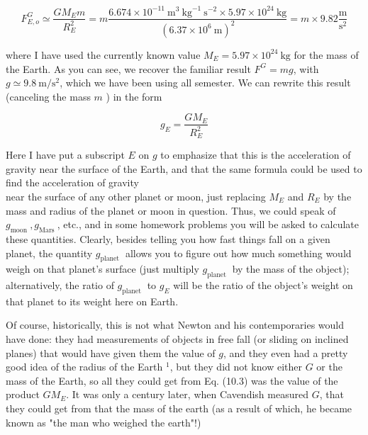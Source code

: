 \documentclass[10pt]{article}
\begin{document}
\begin{equation*}
F_{E, o}^{G} \simeq \frac{G M_{E} m}{R_{E}^{2}}=m \frac{6.674 \times 10^{-11} \mathrm{~m}^{3} \mathrm{~kg}^{-1} \mathrm{~s}^{-2} \times 5.97 \times 10^{24} \mathrm{~kg}}{\left(6.37 \times 10^{6} \mathrm{~m}\right)^{2}}=m \times 9.82 \frac{\mathrm{m}}{\mathrm{s}^{2}} \tag{10.2}
\end{equation*}


where I have used the currently known value $M_{E}=5.97 \times 10^{24} \mathrm{~kg}$ for the mass of the Earth. As you can see, we recover the familiar result $F^{G}=m g$, with $g \simeq 9.8 \mathrm{~m} / \mathrm{s}^{2}$, which we have been using all semester. We can rewrite this result (canceling the mass $m$ ) in the form


\begin{equation*}
g_{E}=\frac{G M_{E}}{R_{E}^{2}} \tag{10.3}
\end{equation*}


Here I have put a subscript $E$ on $g$ to emphasize that this is the acceleration of gravity near the surface of the Earth, and that the same formula could be used to find the acceleration of gravity\\
near the surface of any other planet or moon, just replacing $M_{E}$ and $R_{E}$ by the mass and radius of the planet or moon in question. Thus, we could speak of $g_{\text {moon }}, g_{\text {Mars }}$, etc., and in some homework problems you will be asked to calculate these quantities. Clearly, besides telling you how fast things fall on a given planet, the quantity $g_{\text {planet }}$ allows you to figure out how much something would weigh on that planet's surface (just multiply $g_{\text {planet }}$ by the mass of the object); alternatively, the ratio of $g_{\text {planet }}$ to $g_{E}$ will be the ratio of the object's weight on that planet to its weight here on Earth.

Of course, historically, this is not what Newton and his contemporaries would have done: they had measurements of objects in free fall (or sliding on inclined planes) that would have given them the value of $g$, and they even had a pretty good idea of the radius of the Earth ${ }^{1}$, but they did not know either $G$ or the mass of the Earth, so all they could get from Eq. (10.3) was the value of the product $G M_{E}$. It was only a century later, when Cavendish measured $G$, that they could get from that the mass of the earth (as a result of which, he became known as "the man who weighed the earth"!)
\end{document}
